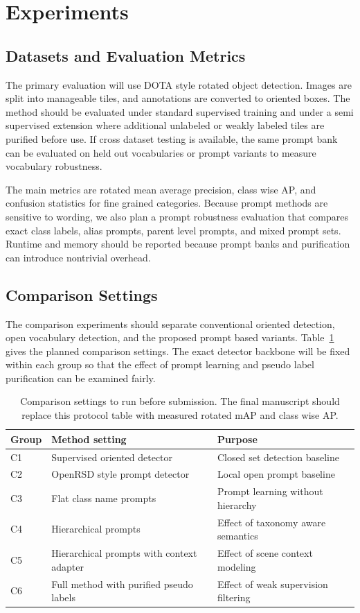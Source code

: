 \documentclass[10pt]{article}
\begin{document}
\section{Experiments}

\subsection{Datasets and Evaluation Metrics}

The primary evaluation will use DOTA style rotated object detection. Images are split into manageable tiles, and annotations are converted to oriented boxes. The method should be evaluated under standard supervised training and under a semi supervised extension where additional unlabeled or weakly labeled tiles are purified before use. If cross dataset testing is available, the same prompt bank can be evaluated on held out vocabularies or prompt variants to measure vocabulary robustness.

The main metrics are rotated mean average precision, class wise AP, and confusion statistics for fine grained categories. Because prompt methods are sensitive to wording, we also plan a prompt robustness evaluation that compares exact class labels, alias prompts, parent level prompts, and mixed prompt sets. Runtime and memory should be reported because prompt banks and purification can introduce nontrivial overhead.

\subsection{Comparison Settings}

The comparison experiments should separate conventional oriented detection, open vocabulary detection, and the proposed prompt based variants. Table~\ref{tab:comparison} gives the planned comparison settings. The exact detector backbone will be fixed within each group so that the effect of prompt learning and pseudo label purification can be examined fairly.

\begin{table}[t]
\centering
\small
\caption{Comparison settings to run before submission. The final manuscript should replace this protocol table with measured rotated mAP and class wise AP.}
\begin{tabular}{lll}
\toprule
Group & Method setting & Purpose \\
\midrule
C1 & Supervised oriented detector & Closed set detection baseline \\
C2 & OpenRSD style prompt detector & Local open prompt baseline \\
C3 & Flat class name prompts & Prompt learning without hierarchy \\
C4 & Hierarchical prompts & Effect of taxonomy aware semantics \\
C5 & Hierarchical prompts with context adapter & Effect of scene context modeling \\
C6 & Full method with purified pseudo labels & Effect of weak supervision filtering \\
\bottomrule
\end{tabular}
\label{tab:comparison}
\end{table}
\end{document}
